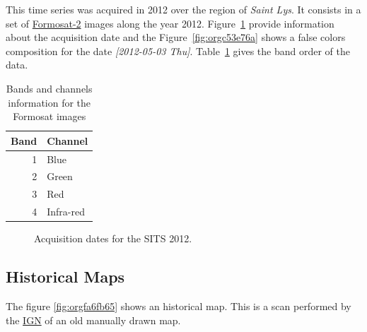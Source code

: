 \documentclass[a4paper,11pt,DIV=18]{scrartcl}
\begin{document}
This time series was acquired in 2012 over the region of \emph{Saint Lys}. It
consists  in  a  set  of   \href{http://www.satimagingcorp.com/satellite-sensors/other-satellite-sensors/formosat-2/}{Formosat-2}  images  along  the  year  2012.
Figure~\ref{fig:SITS} provide information  about the acquisition
date and the Figure~\ref{fig:orgc53e76a} shows a false colors composition for
the  date \textit{[2012-05-03 Thu]}. Table~\ref{tab:org8343c2b}  gives the
band order of the data.

\begin{table}[htbp]
\caption{\label{tab:org8343c2b}
Bands and channels information for the Formosat images}
\centering
\begin{tabular}{rl}
\toprule
Band & Channel\\
\midrule
1 & Blue\\
2 & Green\\
3 & Red\\
4 & Infra-red\\
\bottomrule
\end{tabular}
\end{table}

\begin{figure}[tb]
  \centering
  \caption{Acquisition dates for the SITS 2012.}
  \label{fig:SITS}
\end{figure}

\subsection{Historical Maps}
\label{sec:org874f073}
The figure \ref{fig:orgfa6fb65} shows an historical map. This is a scan performed by
the \href{http://www.ign.fr/}{IGN} of an old manually drawn map.
\end{document}
